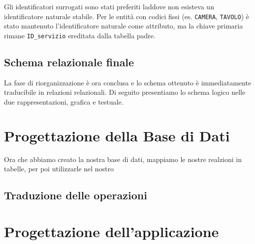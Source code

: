 \documentclass[a4paper,12pt]{report}
\begin{document}
Gli identificatori surrogati sono stati preferiti laddove non esisteva un identificatore naturale stabile. Per le entità con codici fissi (es. \texttt{CAMERA}, \texttt{TAVOLO}) è stato mantenuto l'identificatore naturale come attributo, ma la chiave primaria rimane \texttt{ID\_servizio} ereditata dalla tabella padre.
\section{Schema relazionale finale}
La fase di riorganizzazione è ora conclusa e lo schema ottenuto è immediatamente traducibile
in relazioni relazionali. Di seguito presentiamo lo schema logico nelle due rappresentazioni, grafica e testuale.

\chapter{Progettazione della Base di Dati}
Ora che abbiamo creato la nostra base di dati, mappiamo le nostre realzioni in tabelle, per poi utilizzarle nel nostro

\section{Traduzione delle operazioni}

\chapter{Progettazione dell'applicazione}
\end{document}
